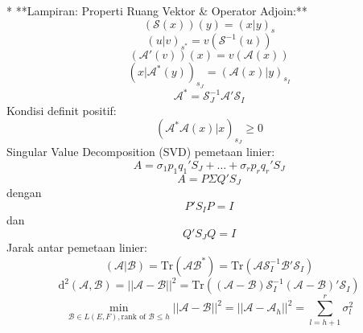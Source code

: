 *   **Lampiran: Properti Ruang Vektor & Operator Adjoin:**
    $$(\mathscr{S}(x))(y) = (x|y)_s$$
    $$(u|v)_{s^*} = v(\mathscr{S}^{-1}(u))$$
    $$(\mathscr{A}'(v))(x) = v(\mathscr{A}(x))$$
    $$(x|\mathscr{A}^*(y))_{s_J} = (\mathscr{A}(x)|y)_{s_I}$$
    $$\mathscr{A}^* = \mathscr{S}_J^{-1} \mathscr{A}' \mathscr{S}_I$$
    Kondisi definit positif:
    $$(\mathscr{A}^*\mathscr{A}(x)|x)_{s_J} \geq 0$$
    Singular Value Decomposition (SVD) pemetaan linier:
    $$A = \sigma_1 p_1 q_1' S_J + \dots + \sigma_r p_r q_r' S_J$$
    $$A = P \Sigma Q' S_J$$ dengan $$P' S_I P = I$$ dan $$Q' S_J Q = I$$
    Jarak antar pemetaan linier:
    $$(\mathscr{A}|\mathscr{B}) = \text{Tr}(\mathscr{A}\mathscr{B}^*) = \text{Tr}(\mathscr{A}\mathscr{S}_I^{-1}\mathscr{B}'\mathscr{S}_I)$$
    $$\text{d}^2(\mathscr{A}, \mathscr{B}) = ||\mathscr{A} - \mathscr{B}||^2 = \text{Tr}((\mathscr{A}-\mathscr{B})\mathscr{S}_I^{-1}(\mathscr{A}-\mathscr{B})'\mathscr{S}_I)$$
    $$\min_{\mathscr{B} \in L(E,F), \text{rank of } \mathscr{B} \leq h} ||\mathscr{A} - \mathscr{B}||^2 = ||\mathscr{A} - \mathscr{A}_h||^2 = \sum_{l=h+1}^r \sigma_l^2$$